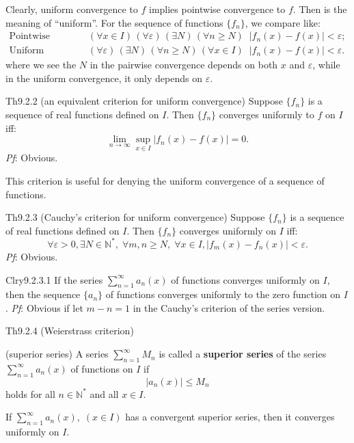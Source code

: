 \documentclass{article}
\begin{document}
\begin{Rmk}{}
    \textcolor{Th}{Clearly, uniform convergence to $f$ implies pointwise convergence to $f$.} Then is the meaning of ``uniform''. For the sequence of functions $\{f_n\}$, we compare like:
    $$
    \begin{aligned}
        \text{Pointwise convergence:} & \quad (\forall x\in I) \,(\forall \varepsilon) \,(\exists N) \,(\forall n\geq N) \;\;|f_n(x) - f(x)| < \varepsilon; \\
        \text{Uniform convergence:} & \quad (\forall \varepsilon) \,(\exists N) \,(\forall n\geq N) \,(\forall x\in I) \;\;|f_n(x) - f(x)| < \varepsilon.
    \end{aligned}
    $$
    where we see the $N$ in the pairwise convergence depends on both $x$ and $\varepsilon$, while in the uniform convergence, it only depends on $\varepsilon$.
\end{Rmk}

\begin{Th}{Th9.2.2 (an equivalent criterion for uniform convergence)}
    Suppose $\{f_n\}$ is a sequence of real functions defined on $I$. Then $\{f_n\}$ converges uniformly to $f$ on $I$ iff:
    $$ \lim\limits_{n\to\infty} \sup_{x\in I} |f_n(x) - f(x)| = 0. $$
    \tcblower
    \textit{Pf}: Obvious.
\end{Th}

\begin{Rmk}{}
    This criterion is useful for denying the uniform convergence of a sequence of functions.
\end{Rmk}

\begin{Th}{Th9.2.3 (Cauchy's criterion for uniform convergence)}
    Suppose $\{f_n\}$ is a sequence of real functions defined on $I$. Then $\{f_n\}$ converges uniformly on $I$ iff:
    $$ \forall \varepsilon > 0, \exists N\in\mathbb{N}^\ast,\; \forall m,n \geq N,\; \forall x\in I, |f_m(x) - f_n(x)| < \varepsilon. $$
    \tcblower
    \textit{Pf}: Obvious.
\end{Th}

\begin{Th}{Clry9.2.3.1}
    If the series $\sum_{n=1}^{\infty} a_n(x)$ of functions converges uniformly on $I$, then the sequence $\{a_n\}$ of functions converges uniformly to the zero function on $I$.
    \tcblower
    \textit{Pf}: Obvious if let $m-n = 1$ in the Cauchy's criterion of the series version.
\end{Th}

\begin{Th}{Th9.2.4 (Weierstrass criterion)}
    \begin{compactenum}
        \item (superior series) \textcolor{Df}{A series $\sum_{n=1}^{\infty} M_n$ is called a \textbf{superior series} of the series $\sum_{n=1}^{\infty} a_n(x)$ of functions on $I$ if
        $$ |a_n(x)| \leq M_n $$
        holds for all $n\in\mathbb{N}^\ast$ and all $x\in I$.}
        \item If $\sum_{n=1}^{\infty} a_n(x),\; (x\in I)$ has a convergent superior series, then it converges uniformly on $I$. 
    \end{compactenum}
\end{Th}
\end{document}

